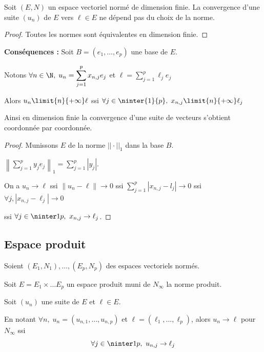 \begin{theoreme}{}{}
    Soit $(E, N)$ un espace vectoriel normé de dimension finie. La convergence d'une suite $(u_n)$ de $E$
    vers $\ell \in E$ ne dépend pas du choix de la norme. 
\end{theoreme}

\begin{proof}
    Toutes les normes sont équivalentes en dimension finie. 
\end{proof}

\textbf{Conséquences :}
Soit $B = (e_1, \dots, e_p)$ une base de $E$.

Notons $\displaystyle  \forall n \in \N, \; u_n = \sum_{j = 1}^{p} x_{n, j} e_j$
et $\displaystyle \ell = \sum_{j = 1}^{p} \ell_j e_j$

Alors $u_n \limit{n}{+ \infty} \ell$ ssi $\forall j \in \ninter{1}{p}, \; x_{n, j} \limit{n}{+ \infty} \ell_j$

Ainsi en dimension finie la convergence d'une suite de vecteurs s'obtient coordonnée par coordonnée. 

\begin{proof}
    Munissons $E$ de la norme $||\cdot||_1$ dans la base $B$. 

    $\displaystyle \left\|\sum_{j =  1}^{p} y_je_j\right\|_1 = \sum_{j = 1}^{p} |y_j|$.

    On a $u_n \to \ell$ ssi $\| u_n - \ell\| \to 0$ ssi 
    $\displaystyle \sum_{j = 1}^{p }|x_{n, j} - l_j| \to 0$ ssi 
    $\forall j, |x_{n, j} - \ell_j| \to 0$

    ssi $\forall j \in \ninter 1 p,~x_{n, j} \to \ell_j$. 
\end{proof}

\subsection{Espace produit}

\begin{definition}{}{}
    Soient $(E_1, N_1), \dots, (E_p, N_p)$ des espaces vectoriels normés.

    Soit $E = E_1 \times \dots E_p$ un espace produit muni de $N_\infty$ la norme produit. 

    Soit $(u_n)$ une suite de $E$ et $\ell \in E$.

    En notant $\forall n, \; u_n = (u_{n, 1}, \dots, u_{n, p})$ et $\ell = (\ell_1, \dots, \ell_p)$, 
    alors $u_n \to \ell$ pour $N_\infty$ ssi
    \[\forall j \in \ninter 1 p,~u_{n, j} \to \ell_j\]
\end{definition}

